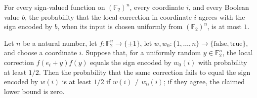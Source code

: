 \begin{theorem}
\label{FABL.affineCoordinateCorrectionProbability_le_one}
\leanok
{}
For every sign-valued function on $(\mathbb{F}_2)^n$, every coordinate $i$, and every
Boolean value $b$, the probability that the local correction in coordinate $i$ agrees
with the sign encoded by $b$, when its input is chosen uniformly from
$(\mathbb{F}_2)^n$, is at most $1$.
\end{theorem}

\begin{theorem}
\label{FABL.half_mismatch_le_affineCoordinateCorrection_rejection}
\leanok
{}
Let $n$ be a natural number, let $f:\mathbb F_2^n\to\{\pm1\}$, let
$w,w_0:\{1,\ldots,n\}\to\{\mathrm{false},\mathrm{true}\}$, and choose a coordinate $i$.
Suppose that, for a uniformly random $y\in\mathbb F_2^n$, the local correction
$f(e_i+y)f(y)$ equals the sign encoded by $w_0(i)$ with probability at least $1/2$. Then
the probability that the same correction fails to equal the sign encoded by $w(i)$ is at
least $1/2$ if $w(i)\ne w_0(i)$; if they agree, the claimed lower bound is zero.
\end{theorem}

